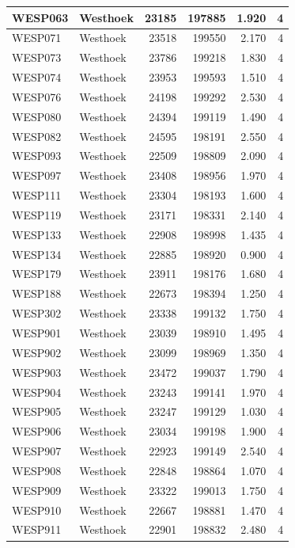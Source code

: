\documentclass[11pt,]{book}
\begin{document}
\begin{table}
\begin{tabular}[t]{l|l|r|r|r|r}
\hline
WESP063 & Westhoek & 23185 & 197885 & 1.920 & 4\\
\hline
WESP071 & Westhoek & 23518 & 199550 & 2.170 & 4\\
\hline
WESP073 & Westhoek & 23786 & 199218 & 1.830 & 4\\
\hline
WESP074 & Westhoek & 23953 & 199593 & 1.510 & 4\\
\hline
WESP076 & Westhoek & 24198 & 199292 & 2.530 & 4\\
\hline
WESP080 & Westhoek & 24394 & 199119 & 1.490 & 4\\
\hline
WESP082 & Westhoek & 24595 & 198191 & 2.550 & 4\\
\hline
WESP093 & Westhoek & 22509 & 198809 & 2.090 & 4\\
\hline
WESP097 & Westhoek & 23408 & 198956 & 1.970 & 4\\
\hline
WESP111 & Westhoek & 23304 & 198193 & 1.600 & 4\\
\hline
WESP119 & Westhoek & 23171 & 198331 & 2.140 & 4\\
\hline
WESP133 & Westhoek & 22908 & 198998 & 1.435 & 4\\
\hline
WESP134 & Westhoek & 22885 & 198920 & 0.900 & 4\\
\hline
WESP179 & Westhoek & 23911 & 198176 & 1.680 & 4\\
\hline
WESP188 & Westhoek & 22673 & 198394 & 1.250 & 4\\
\hline
WESP302 & Westhoek & 23338 & 199132 & 1.750 & 4\\
\hline
WESP901 & Westhoek & 23039 & 198910 & 1.495 & 4\\
\hline
WESP902 & Westhoek & 23099 & 198969 & 1.350 & 4\\
\hline
WESP903 & Westhoek & 23472 & 199037 & 1.790 & 4\\
\hline
WESP904 & Westhoek & 23243 & 199141 & 1.970 & 4\\
\hline
WESP905 & Westhoek & 23247 & 199129 & 1.030 & 4\\
\hline
WESP906 & Westhoek & 23034 & 199198 & 1.900 & 4\\
\hline
WESP907 & Westhoek & 22923 & 199149 & 2.540 & 4\\
\hline
WESP908 & Westhoek & 22848 & 198864 & 1.070 & 4\\
\hline
WESP909 & Westhoek & 23322 & 199013 & 1.750 & 4\\
\hline
WESP910 & Westhoek & 22667 & 198881 & 1.470 & 4\\
\hline
WESP911 & Westhoek & 22901 & 198832 & 2.480 & 4\\

\end{tabular}
\end{table}
\end{document}
